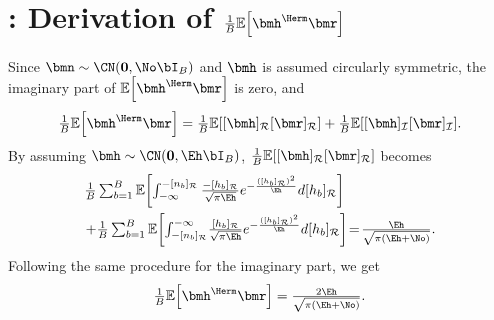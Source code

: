 
 \label{app:bussgang_gain}
\section*{: Derivation of $\frac{1}{B}\E{\bmh^\Herm\bmr}$} 
Since $\bmn\sim\CN(\boldsymbol0,\No\bI_B)$ and $\bmh$ is assumed circularly symmetric, the imaginary part of $\E{\bmh^\Herm\bmr}$ is zero, and
\begin{align}
\textstyle\frac{1}{B}\E{\bmh^\Herm\bmr} = 
\frac{1}{B}\E{\realindex{\bmh}\realindex{\bmr}} + \frac{1}{B}\E{\imagindex{\bmh}\imagindex{\bmr}}\!.
\end{align}
By assuming $\bmh\sim\CN(\boldsymbol0,\Eh\bI_B)$, $\frac{1}{B} \E{\realindex{\bmh}\realindex{\bmr}}$ becomes
\begin{align}
\textstyle\frac{1}{B} & \textstyle\sum_{b=1}^{B}\E{\int_{-\infty}^{-\realindex{n_b}}\frac{-\realindex{h_b}}{\sqrt{\pi\Eh}}e^{-\frac{(\realindex{h_b})^2}{\Eh}}d\realindex{h_b}} \\
\textstyle + & \textstyle\frac{1}{B}\sum_{b=1}^{B}\E{\int_{-\realindex{n_b}}^{-\infty}\!\frac{\realindex{h_b}}{\sqrt{\pi\Eh}}e^{-\frac{(\realindex{h_b})^2}{\Eh}}d\realindex{h_b}}
\!=\! \textstyle\frac{\Eh}{\sqrt{\pi(\Eh+\No)}}. \notag 
\end{align}
Following the same procedure for the imaginary part, we get
\begin{align}
\textstyle\frac{1}{B}\E{\bmh^\Herm\bmr} = \textstyle\frac{2\Eh}{\sqrt{\pi({\Eh}+{\No})}}.
\end{align}
\vspace{-0.4cm}